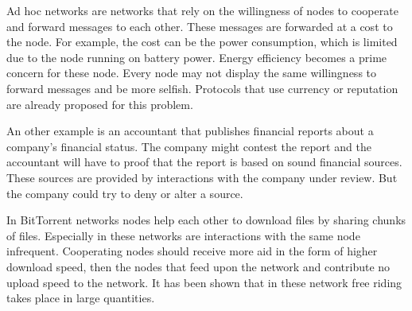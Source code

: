 Ad hoc networks are networks that rely on the willingness of nodes to cooperate
and forward messages to each other.
These messages are forwarded at a cost to the node.
For example, the cost can be the power consumption, 
which is limited due to the node running on battery power.
Energy efficiency becomes a prime concern for these node. 
Every node may not display the same willingness to forward messages and be more selfish.
Protocols that use currency or reputation are already proposed
for this problem\cite{Anderegg-AdHoc}.

An other example is an accountant that publishes financial reports about a company's financial status. 
The company might contest the report
and the accountant will have to proof that the report is based on sound financial sources.
These sources are provided by interactions with the company under review.
But the company could try to deny or alter a source\cite{Maniatis-Timeline}.

In BitTorrent networks nodes help each other to download files by sharing chunks of files.
Especially in these networks are interactions with the same node infrequent\cite{Lai-Incentives}.
Cooperating nodes should receive more aid in the form of higher download speed,
then the nodes that feed upon the network and contribute no upload speed to the network.
It has been shown that in these network
free riding takes place in large quantities\cite{Adar-Freeriding}.
